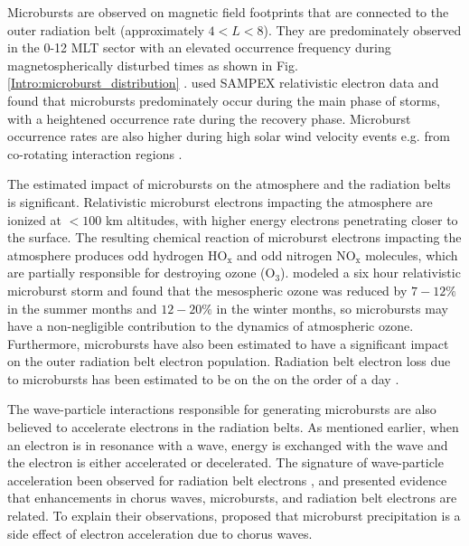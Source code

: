 Microbursts are observed on magnetic field footprints that are connected to the outer radiation belt (approximately $4 < L < 8$). They are predominately observed in the 0-12 MLT sector with an elevated occurrence frequency during magnetospherically disturbed times as shown in Fig. \ref{Intro:microburst_distribution} \citep[e.g.][]{Douma2017}. \citet{O'Brien2003} used SAMPEX relativistic electron data and found that microbursts predominately occur during the main phase of storms, with a heightened occurrence rate during the recovery phase. Microburst occurrence rates are also higher during high solar wind velocity events e.g. from co-rotating interaction regions \citep{O'Brien2003, Greeley2019}.

The estimated impact of microbursts on the atmosphere and the radiation belts is significant. Relativistic microburst electrons impacting the atmosphere are ionized at $<100$ km altitudes, with higher energy electrons penetrating closer to the surface. The resulting chemical reaction of microburst electrons impacting the atmosphere produces odd hydrogen $\mathrm{HO_x}$ and odd nitrogen $\mathrm{NO_x}$ molecules, which are partially responsible for destroying ozone ($\mathrm{O_3}$). \citet{Seppala2018} modeled a six hour relativistic microburst storm and found that the mesospheric ozone was reduced by $7-12 \%$ in the summer months and $12-20 \%$ in the winter months, so microbursts may have a non-negligible contribution to the dynamics of atmospheric ozone. Furthermore, microbursts have also been estimated to have a significant impact on the outer radiation belt electron population. Radiation belt electron loss due to microbursts has been estimated to be on the on the order of a day \citep{Lorentzen2001b, O'Brien2004, Thorne2005, Breneman2017, Douma2019}. 

The wave-particle interactions responsible for generating microbursts are also believed to accelerate electrons in the radiation belts. As mentioned earlier, when an electron is in resonance with a wave, energy is exchanged with the wave and the electron is either accelerated or decelerated. The signature of wave-particle acceleration been observed for radiation belt electrons \citep[e.g.][]{Meredith2002, Horne2005, Reeves2013}, and \citet{O'Brien2003} presented evidence that enhancements in chorus waves, microbursts, and radiation belt electrons are related. To explain their observations, \citet{O'Brien2003} proposed that microburst precipitation is a side effect of electron acceleration due to chorus waves. 

